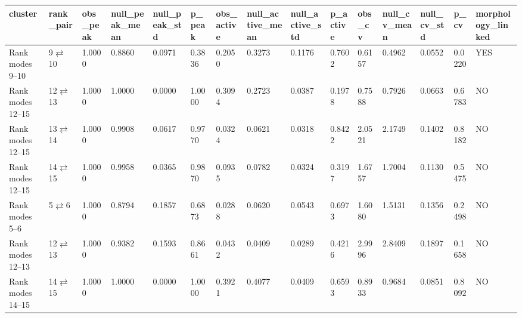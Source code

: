 \begin{tabular}{lllllllllllllll}
\toprule
cluster & rank\_pair & obs\_peak & null\_peak\_mean & null\_peak\_std & p\_peak & obs\_active & null\_active\_mean & null\_active\_std & p\_active & obs\_cv & null\_cv\_mean & null\_cv\_std & p\_cv & morphology\_linked \\
\midrule
Rank modes 9--10 & 9$\rightleftarrows$10 & 1.0000 & 0.8860 & 0.0971 & 0.3836 & 0.2050 & 0.3273 & 0.1176 & 0.7602 & 0.6157 & 0.4962 & 0.0552 & 0.0220 & YES \\
Rank modes 12--15 & 12$\rightleftarrows$13 & 1.0000 & 1.0000 & 0.0000 & 1.0000 & 0.3094 & 0.2723 & 0.0387 & 0.1978 & 0.7588 & 0.7926 & 0.0663 & 0.6783 & NO \\
Rank modes 12--15 & 13$\rightleftarrows$14 & 1.0000 & 0.9908 & 0.0617 & 0.9770 & 0.0324 & 0.0621 & 0.0318 & 0.8422 & 2.0521 & 2.1749 & 0.1402 & 0.8182 & NO \\
Rank modes 12--15 & 14$\rightleftarrows$15 & 1.0000 & 0.9958 & 0.0365 & 0.9870 & 0.0935 & 0.0782 & 0.0324 & 0.3197 & 1.6757 & 1.7004 & 0.1130 & 0.5475 & NO \\
Rank modes 5--6 & 5$\rightleftarrows$6 & 1.0000 & 0.8794 & 0.1857 & 0.6873 & 0.0288 & 0.0620 & 0.0543 & 0.6973 & 1.6080 & 1.5131 & 0.1356 & 0.2498 & NO \\
Rank modes 12--13 & 12$\rightleftarrows$13 & 1.0000 & 0.9382 & 0.1593 & 0.8661 & 0.0432 & 0.0409 & 0.0289 & 0.4216 & 2.9996 & 2.8409 & 0.1897 & 0.1658 & NO \\
Rank modes 14--15 & 14$\rightleftarrows$15 & 1.0000 & 1.0000 & 0.0000 & 1.0000 & 0.3921 & 0.4077 & 0.0409 & 0.6593 & 0.8933 & 0.9684 & 0.0851 & 0.8092 & NO \\
\bottomrule
\end{tabular}
